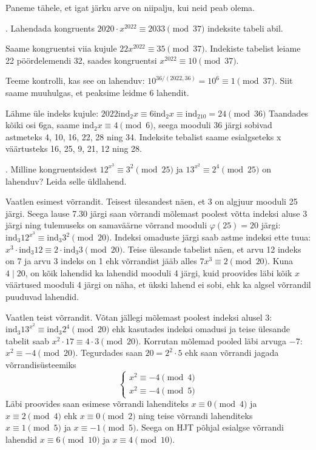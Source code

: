 \documentclass[a4paper, 10pt]{article}
\newcommand{\ind}{\mathrm{ind}}
\begin{document}
Paneme tähele, et igat järku arve on niipalju, kui neid peab olema.
\bigskip

. Lahendada kongruents $2020\cdot x^{2022}\equiv 2033\pmod{37}$ indeksite tabeli abil.  

\bigskip
Saame kongruentsi viia kujule $22x^{2022}\equiv35\pmod{37}$. Indekiste tabelist leiame 22 pöördelemendi 32, saades kongruentsi $x^{2022}\equiv10\pmod{37}$. 

Teeme kontrolli, kas see on lahenduv: $10^{36/(2022,36)}=10^6\equiv 1\pmod{37}$. Siit saame muuhulgas, et peaksime leidme 6 lahendit.

Lähme üle indeks kujule: $2022\ind_2x\equiv6\ind_2x\equiv\ind_210=24\pmod{36}$ Taandades kõiki osi 6ga, saame $\ind_2x\equiv4\pmod{6}$, seega mooduli 36 järgi sobivad astmeteks 4, 10, 16, 22, 28 ning 34. Indeksite tebalist saame esialgseteks x väärtusteks 16, 25, 9, 21, 12 ning 28.



\bigskip

. Milline kongruentsidest $12^{x^3}\equiv 3^2\pmod{25}$ ja $13^{x^2}\equiv 2^4\pmod{25}$ on lahen\-duv? Leida selle üldlahend.  

\bigskip
Vaatlen esimest võrrandit. Teisest ülesandest näen, et 3 on algjuur mooduli 25 järgi. Seega lause 7.30 järgi saan võrrandi mõlemast poolest võtta indeksi aluse 3 järgi ning tulemuseks on samaväärne võrrand mooduli $\varphi(25)=20$ järgi: $\ind_{3}12^{x^3}\equiv\ind_{3}3^2\pmod{20}$. Indeksi omaduste järgi saab astme indeksi ette tuua: $x^3\cdot\ind_{3}12\equiv2\cdot\ind_{3}3\pmod{20}$. Teise ülesande tabelist näen, et arvu 12 indeks on 7 ja arvu 3 indeks on 1 ehk võrrandist jääb alles $7x^3\equiv2\pmod{20}$. Kuna $4\mid 20$, on kõik lahendid ka lahendid mooduli 4 järgi, kuid proovides läbi kõik $x$ väärtused mooduli 4 järgi on näha, et ükski lahend ei sobi, ehk ka algsel võrrandil puuduvad lahendid.

Vaatlen teist võrrandit. Võtan jällegi mõlemast poolest indeksi alusel 3: $\ind_{3}13^{x^2}\equiv\ind_{3}2^4\pmod{20}$ ehk kasutades indeksi omadusi ja teise ülesande tabelit saab $x^2\cdot 17\equiv4\cdot3\pmod{20}$. Korrutan mõlemad pooled läbi arvuga $-7$: $x^2\equiv-4\pmod{20}$. Tegurdades saan $20=2^2\cdot5$ ehk saan võrrandi jagada võrrandisüsteemiks $$\begin{cases}x^2\equiv-4\pmod{4}\\x^2\equiv-4\pmod{5}\end{cases}$$ Läbi proovides saan esimese võrrandi lahenditeks $x\equiv0\pmod4$ ja $x\equiv2\pmod4$ ehk $x\equiv0\pmod2$ ning teise võrrandi lahenditeks $x\equiv1\pmod5$ ja $x\equiv-1\pmod5$. Seega on HJT põhjal esialgse võrrandi lahendid $x\equiv6\pmod{10}$ ja $x\equiv 4\pmod{10}$.
\bigskip
\end{document}
